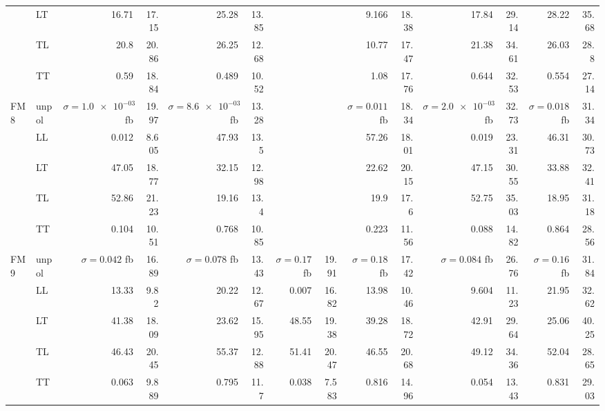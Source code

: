 \begin{table}[h]
{\begin{tabular}{llrrrrrrrrrrrr}
 & LT & \num{16.71} & \num{17.15} & \num{25.28} & \num{13.85} &  &  & \num{9.166} & \num{18.38} & \num{17.84} & \num{29.14} & \num{28.22} & \num{35.68} \\
 & TL & \num{20.8} & \num{20.86} & \num{26.25} & \num{12.68} &  &  & \num{10.77} & \num{17.47} & \num{21.38} & \num{34.61} & \num{26.03} & \num{28.8} \\
 & TT & \num{0.59} & \num{18.84} & \num{0.489} & \num{10.52} &  &  & \num{1.08} & \num{17.76} & \num{0.644} & \num{32.53} & \num{0.554} & \num{27.14} \\
\midrule
\multirow{5}{*}{FM8}
 & unpol & $\sigma = \num{1.0e-03}$ fb & \num{19.97} & $\sigma = \num{8.6e-03}$ fb & \num{13.28} &  &  & $\sigma = \num{0.011}$ fb & \num{18.34} & $\sigma = \num{2.0e-03}$ fb & \num{32.73} & $\sigma = \num{0.018}$ fb & \num{31.34} \\
 & LL & \num{0.012} & \num{8.605} & \num{47.93} & \num{13.5} &  &  & \num{57.26} & \num{18.01} & \num{0.019} & \num{23.31} & \num{46.31} & \num{30.73} \\
 & LT & \num{47.05} & \num{18.77} & \num{32.15} & \num{12.98} &  &  & \num{22.62} & \num{20.15} & \num{47.15} & \num{30.55} & \num{33.88} & \num{32.41} \\
 & TL & \num{52.86} & \num{21.23} & \num{19.16} & \num{13.4} &  &  & \num{19.9} & \num{17.6} & \num{52.75} & \num{35.03} & \num{18.95} & \num{31.18} \\
 & TT & \num{0.104} & \num{10.51} & \num{0.768} & \num{10.85} &  &  & \num{0.223} & \num{11.56} & \num{0.088} & \num{14.82} & \num{0.864} & \num{28.56} \\
\midrule
\multirow{5}{*}{FM9}
 & unpol & $\sigma = \num{0.042}$ fb & \num{16.89} & $\sigma = \num{0.078}$ fb & \num{13.43} & $\sigma = \num{0.17}$ fb & \num{19.91} & $\sigma = \num{0.18}$ fb & \num{17.42} & $\sigma = \num{0.084}$ fb & \num{26.76} & $\sigma = \num{0.16}$ fb & \num{31.84} \\
 & LL & \num{13.33} & \num{9.82} & \num{20.22} & \num{12.67} & \num{0.007} & \num{16.82} & \num{13.98} & \num{10.46} & \num{9.604} & \num{11.23} & \num{21.95} & \num{32.62} \\
 & LT & \num{41.38} & \num{18.09} & \num{23.62} & \num{15.95} & \num{48.55} & \num{19.38} & \num{39.28} & \num{18.72} & \num{42.91} & \num{29.64} & \num{25.06} & \num{40.25} \\
 & TL & \num{46.43} & \num{20.45} & \num{55.37} & \num{12.88} & \num{51.41} & \num{20.47} & \num{46.55} & \num{20.68} & \num{49.12} & \num{34.36} & \num{52.04} & \num{28.65} \\
 & TT & \num{0.063} & \num{9.889} & \num{0.795} & \num{11.7} & \num{0.038} & \num{7.583} & \num{0.816} & \num{14.96} & \num{0.054} & \num{13.43} & \num{0.831} & \num{29.03} \\
\bottomrule
\end{tabular}
}%
\end{table}